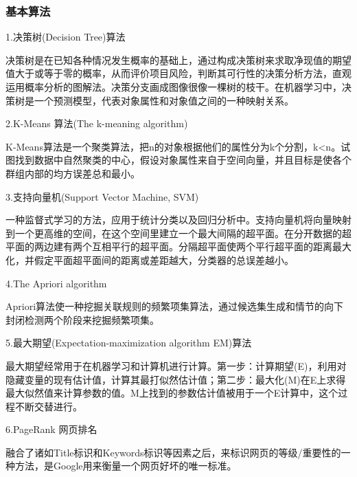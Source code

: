 \documentclass[openbib]{article}
\begin{document}
	\subsubsection{基本算法}
	\begin{center}
		1.决策树(Decision Tree)算法
	\end{center}

	决策树是在已知各种情况发生概率的基础上，通过构成决策树来求取净现值的期望值大于或等于零的概率，从而评价项目风险，判断其可行性的决策分析方法，直观运用概率分析的图解法。决策分支画成图像很像一棵树的枝干。在机器学习中，决策树是一个预测模型，代表对象属性和对象值之间的一种映射关系。
	
	\begin{center}
		2.K-Means 算法(The k-meaning algorithm)
	\end{center}

	K-Means算法是一个聚类算法，把n的对象根据他们的属性分为k个分割，k<n。试图找到数据中自然聚类的中心，假设对象属性来自于空间向量，并且目标是使各个群组内部的均方误差总和最小。
	
	\begin{center}
		3.支持向量机(Support Vector Machine, SVM)
	\end{center}

	一种监督式学习的方法，应用于统计分类以及回归分析中。支持向量机将向量映射到一个更高维的空间，在这个空间里建立一个最大间隔的超平面。在分开数据的超平面的两边建有两个互相平行的超平面。分隔超平面使两个平行超平面的距离最大化，并假定平面超平面间的距离或差距越大，分类器的总误差越小。
	
	\begin{center}
		4.The Apriori algorithm
	\end{center}

	Apriori算法使一种挖掘关联规则的频繁项集算法，通过候选集生成和情节的向下封闭检测两个阶段来挖掘频繁项集。
	
	\begin{center}
		5.最大期望(Expectation-maximization algorithm EM)算法
	\end{center}
	
	最大期望经常用于在机器学习和计算机进行计算。第一步：计算期望(E)，利用对隐藏变量的现有估计值，计算其最打似然估计值；第二步：最大化(M)在E上求得最大似然值来计算参数的值。M上找到的参数估计值被用于一个E计算中，这个过程不断交替进行。
	
	\begin{center}
		6.PageRank 网页排名
	\end{center}

	融合了诸如Title标识和Keywords标识等因素之后，来标识网页的等级/重要性的一种方法，是Google用来衡量一个网页好坏的唯一标准。
\end{document}
